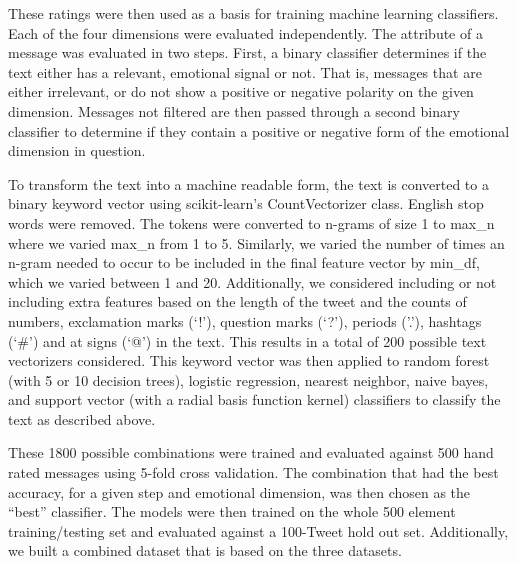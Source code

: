 These ratings were then used as a basis for training machine learning classifiers. Each of the four dimensions were evaluated independently. The attribute of a message was evaluated in two steps. First, a binary classifier determines if the text either has a relevant, emotional signal or not. That is, messages that are either irrelevant, or do not show a positive or negative polarity on the given dimension. Messages not filtered are then passed through a second binary classifier to determine if they contain a positive or negative form of the emotional dimension in question. 

To transform the text into a machine readable form, the text is converted to a binary keyword vector using scikit-learn's\cite{scikit-learn} CountVectorizer class. English stop words were removed. The tokens were converted to n-grams of size 1 to max\_n where we varied max\_n from 1 to 5. Similarly, we varied the number of times an n-gram needed to occur to be included in the final feature vector by min\_df, which we varied between 1 and 20. Additionally, we considered including or not including extra features based on the length of the tweet and the counts of numbers, exclamation marks (`!'), question marks (`?'), periods ('.'), hashtags (`\#') and at signs (`@') in the text. This results in a total of 200 possible text vectorizers considered. This keyword vector was then applied to random forest (with 5 or 10 decision trees), logistic regression, nearest neighbor, naive bayes, and support vector (with a radial basis function kernel) classifiers to classify the text as described above. 

These 1800 possible combinations were trained and evaluated against 500 hand rated messages using 5-fold cross validation. The combination that had the best accuracy, for a given step and emotional dimension, was then chosen as the ``best'' classifier. The models were then trained on the whole 500 element training/testing set and evaluated against a 100-Tweet hold out set. Additionally, we built a combined dataset that is based on the three datasets. 

